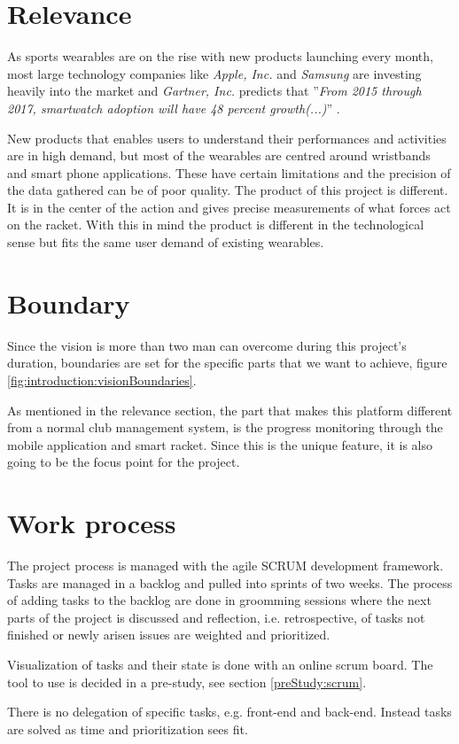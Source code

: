 \section*{Relevance}
As sports wearables are on the rise with new products launching every month, most large technology companies like \textit{Apple, Inc.} and \textit{Samsung} are investing heavily into the market and \textit{Gartner, Inc.} predicts that ''\textit{From 2015 through 2017, smartwatch adoption will have 48 percent growth(...)}'' \citep{introduction:relevance:gartner}.

New products that enables users to understand their performances and activities are in high demand, but most of the wearables are centred around wristbands and smart phone applications. 
These have certain limitations and the precision of the data gathered can be of poor quality.
The product of this project is different. 
It is in the center of the action and gives precise measurements of what forces act on the racket.
With this in mind the product is different in the technological sense but fits the same user demand of existing wearables.

\section*{Boundary}
Since the vision is more than two man can overcome during this project's duration, boundaries are set for the specific parts that we want to achieve, figure \ref{fig:introduction:visionBoundaries}.

As mentioned in the relevance section, the part that makes this platform different from a normal club management system, is the progress monitoring through the mobile application and smart racket. 
Since this is the unique feature, it is also going to be the focus point for the project.


\section*{Work process}
The project process is managed with the agile SCRUM development framework. 
Tasks are managed in a backlog and pulled into sprints of two weeks. 
The process of adding tasks to the backlog are done in groomming sessions where the next parts of the project is discussed and reflection, i.e. retrospective, of tasks not finished or newly arisen issues are weighted and prioritized.

Visualization of tasks and their state is done with an online scrum board. 
The tool to use is decided in a pre-study, see section \ref{preStudy:scrum}.

There is no delegation of specific tasks, e.g. front-end and back-end. 
Instead tasks are solved as time and prioritization sees fit.
